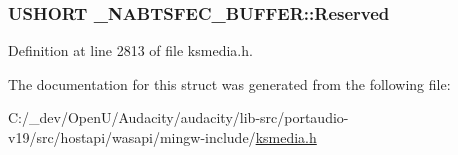 \subsubsection[{\texorpdfstring{Reserved}{Reserved}}]{\setlength{\rightskip}{0pt plus 5cm}U\+S\+H\+O\+RT \+\_\+\+N\+A\+B\+T\+S\+F\+E\+C\+\_\+\+B\+U\+F\+F\+E\+R\+::\+Reserved}\hypertarget{struct___n_a_b_t_s_f_e_c___b_u_f_f_e_r_ab86bb027cabb01948a272585253e46f2}{}\label{struct___n_a_b_t_s_f_e_c___b_u_f_f_e_r_ab86bb027cabb01948a272585253e46f2}


Definition at line 2813 of file ksmedia.\+h.



The documentation for this struct was generated from the following file\+:\begin{DoxyCompactItemize}
\item 
C\+:/\+\_\+dev/\+Open\+U/\+Audacity/audacity/lib-\/src/portaudio-\/v19/src/hostapi/wasapi/mingw-\/include/\hyperlink{ksmedia_8h}{ksmedia.\+h}\end{DoxyCompactItemize}
